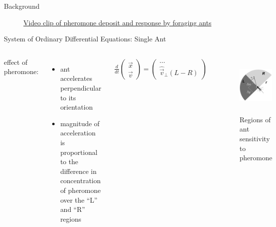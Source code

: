\begin{frame}{Background}
	\begin{figure}
		\begin{center}
		\end{center}
		\caption{\href{http://www.youtube.com/v/c7kiPri9ZFo?rel=0&amp;showinfo=0}{Video clip of pheromone deposit and response by foraging ants}}
	\end{figure}
\end{frame}

\begin{frame}{System of Ordinary Differential Equations: Single Ant}

\begin{columns}[T,onlytextwidth]
     \alert{effect of pheromone:}
\begin{itemize}
    \item ant accelerates perpendicular to its orientation
    \item magnitude of acceleration is proportional to the difference in concentration of pheromone over the ``L'' and ``R'' regions
\end{itemize}


      \begin{align*}
\frac{d}{dt} \begin{pmatrix}\vec{x}\\\vec{v}\end{pmatrix} = \begin{pmatrix}\hdots\\ \hat{\vec{v}}_{\perp}(L - R)\end{pmatrix}
\end{align*}
 \begin{figure}
    	\includegraphics[height=3cm]{images/l_r_regions}
        \caption{Regions of ant sensitivity to pheromone \scriptsize{\cite{perna_individual_2012}}}
    \end{figure}

  \end{columns}
\end{frame}

